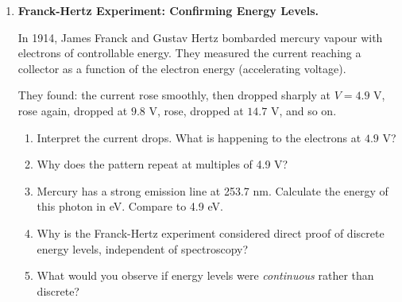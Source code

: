 \documentclass[12pt, a4paper]{book}
\begin{document}
\begin{deepbox}
\begin{enumerate}[label=\textbf{D\arabic*.}]
        \begin{enumerate}[label=(\alph*)]
          \item The energy gap from $n=1$ to $n=2$ is 10.2 eV.
                Calculate the Boltzmann factor $e^{-10.2/k_BT}$
                at $T = 5800$ K (Sun), $T = 10000$ K (A-type star),
                $T = 25000$ K (B-type star).
                Use $k_B = 8.617\times10^{-5}$ eV/K.
          \item Which star type should show the strongest
                Balmer lines?
          \item At very high temperatures ($T > 30000$ K),
                hydrogen becomes fully ionised.
                What happens to the Balmer lines?
          \item At very low temperatures ($T < 4000$ K),
                almost no hydrogen is in $n=2$.
                What happens to the Balmer lines?
          \item Explain why Balmer lines are strongest at
                intermediate temperatures, and sketch a curve
                of Balmer line strength vs temperature.
        \end{enumerate}

  \item \textbf{Franck-Hertz Experiment: Confirming Energy Levels.}

        In 1914, James Franck and Gustav Hertz bombarded mercury
        vapour with electrons of controllable energy.
        They measured the current reaching a collector as a
        function of the electron energy (accelerating voltage).

        They found: the current rose smoothly, then dropped
        sharply at $V = 4.9$ V, rose again, dropped at $9.8$ V,
        rose, dropped at $14.7$ V, and so on.

        \begin{enumerate}[label=(\alph*)]
          \item Interpret the current drops.
                What is happening to the electrons at $4.9$ V?
          \item Why does the pattern repeat at multiples of 4.9 V?
          \item Mercury has a strong emission line at 253.7 nm.
                Calculate the energy of this photon in eV.
                Compare to 4.9 eV.
          \item Why is the Franck-Hertz experiment
                considered direct proof of discrete energy levels,
                independent of spectroscopy?
          \item What would you observe if energy levels were
                \emph{continuous} rather than discrete?
        \end{enumerate}

\end{enumerate}
\end{deepbox}
\end{document}
